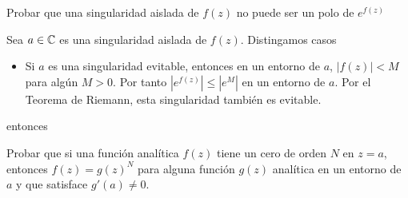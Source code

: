 \documentclass[twoside]{article}
\begin{document}
\begin{ejercicio}{3}
Probar que una singularidad aislada de $f(z)$ no puede ser un polo de $e^{f(z)}$ 
\end{ejercicio}
\begin{solucion}
Sea $a\in \mathbb{C}$ es una singularidad aislada de $f(z)$. Distingamos casos
\begin{itemize}
\item Si $a$ es una singularidad evitable, entonces en un entorno de $a$, $|f(z)|<M$ para algún $M>0$. Por tanto $|e^{f(z)}| \leq |e^M|$ en un entorno de $a$. Por el Teorema de Riemann, esta singularidad también es evitable.

\end{itemize} entonces 
\end{solucion}
\newpage

\begin{ejercicio}{4}
Probar que si una función analítica $f(z)$ tiene un cero de orden $N$ en $z=a$, entonces $f(z)=g(z)^N$ para alguna función $g(z)$ analítica en un entorno de $a$ y que satisface $g'(a)\neq 0$.
\end{ejercicio}
\begin{solucion}

\end{solucion}
\newpage
\end{document}
